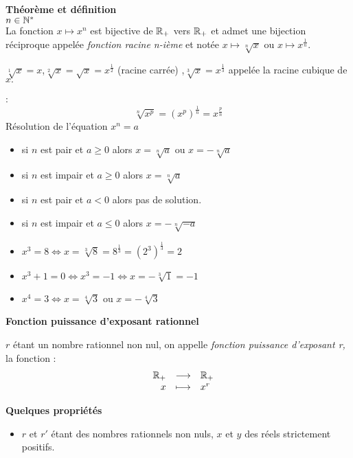 \begin{example}
\textbf{\color{blue}Théorème et définition }\\
$ n\in \mathbb{N}^* $\\
La fonction $x\mapsto x^{n} $ est bijective de $ \mathbb{R}_+ $ vers $ \mathbb{R}_+ $ et admet une bijection réciproque appelée \emph{fonction racine n-ième} et notée $ x\mapsto \sqrt[n]{x} $ ou $x\mapsto x^{\frac{1}{n}} $.
\begin{example}
$ \sqrt[1]{x}=x $,\quad $ \sqrt[2]{x}=\sqrt{x}=x^{\frac{1}{2}}$\; (racine carrée) ,\quad $ \sqrt[3]{x} =x^{\frac{1}{3}}$  appelée la racine cubique de $ x. $
\end{example}

\textbf{\color{blue}{NB}}:
\[\sqrt[n]{x^{p}}= (x^{p})^{\frac{1}{n}}= x^{\frac{p}{n}}\]
 \colorbox{red!20!}{Résolution de l'équation $ x^{n}=a $}
\begin{itemize}
\item[\textbullet] si $ n $ est pair  et  $ a\geq 0 $ alors $ x= \sqrt[n]{a}$ ou $ x= -\sqrt[n]{a}$
\item[\textbullet] si $ n $ est impair  et  $ a\geq 0 $ alors $ x= \sqrt[n]{a}$
\item[\textbullet] si $ n $ est pair  et  $ a < 0 $ alors pas de solution. 
\item[\textbullet] si $ n $ est impair  et  $ a\leq 0 $ alors  $ x= -\sqrt[n]{-a}$
\end{itemize}

\begin{example}
\begin{itemize}
\item $ x^3=8 \Longleftrightarrow x=\sqrt[3]{8}= 8^{\frac{1}{3}} = (2^3)^{\frac{1}{3}}=2$
\item $ x^3+1=0\Longleftrightarrow x^3=-1 \Longleftrightarrow x=-\sqrt[3]{1}= -1$
\item $ x^4= 3 \Longleftrightarrow x= \sqrt[4]{3}$ ou $ x= -\sqrt[4]{3} $  
 \end{itemize}
\end{example}
\textbf{\color{blue}Fonction puissance d'exposant rationnel}
\begin{definition}
$ r $ étant un nombre rationnel non nul, on appelle \emph{fonction puissance d'exposant r,} la fonction : 
\renewcommand{\arraystretch}{1}
\[\begin{array}{lrcl}
    &  \mathbb{R}_+  & \longrightarrow & \mathbb{R}_+ \\ 
  &  x & \longmapsto & x^{r}
   \end{array}\]
\end{definition}
\textbf{\color{blue}Quelques propriétés  }
\begin{itemize}
\item $ r$ et $r' $ étant des nombres rationnels non nuls, $x $ et $ y$ des réels strictement positifs.\\ 


\end{itemize}
\end{example}

